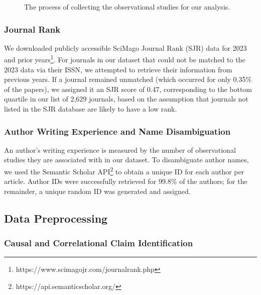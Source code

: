 \begin{appendices}
\begin{figure}[!ht]
\centering
	
	\caption{The process of collecting the observational studies for our analysis.}
	\label{fig__flowchart_data_collection}
\end{figure}


\subsubsection{Journal Rank}

We downloaded publicly accessible SciMago Journal Rank (SJR) data for 2023 and
prior years\footnote{https://www.scimagojr.com/journalrank.php}. For journals in
our dataset that could not be matched to the 2023 data via their ISSN, we
attempted to retrieve their information from previous years. If a journal
remained unmatched (which occurred for only 0.35\% of the papers), we assigned
it an SJR score of 0.47, corresponding to the bottom quartile in our list of
2,629 journals, based on the assumption that journals not listed in the SJR
database are likely to have a low rank.

\subsubsection{Author Writing Experience and Name Disambiguation}

An author’s writing experience is measured by the number of observational
studies they are associated with in our dataset.
To disambiguate author names, we used the
Semantic Scholar API\footnote{https://api.semanticscholar.org/} to obtain a
unique ID for each author per article. Author IDs were successfully retrieved
for 99.8\% of the authors; for the remainder, a unique random ID was generated
and assigned.



\subsection{Data Preprocessing}

\subsubsection{Causal and Correlational Claim Identification} \label{si_causal_or_correlational}


\end{appendices}
